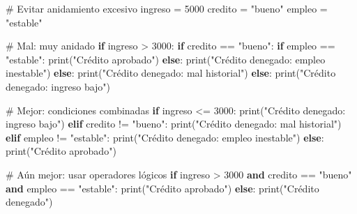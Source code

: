 \documentclass[
  doc,
  floatsintext,
  longtable,
  a4paper,
  nolmodern,
  notxfonts,
  notimes,
  12pt,
  colorlinks=true,linkcolor=blue,citecolor=blue,urlcolor=blue]{apa7}
\newenvironment{Shaded}{\begin{snugshade}}{\end{snugshade}}
\newcommand{\BuiltInTok}[1]{\textcolor[rgb]{0.00,0.23,0.31}{#1}}
\newcommand{\CommentTok}[1]{\textcolor[rgb]{0.37,0.37,0.37}{#1}}
\newcommand{\ControlFlowTok}[1]{\textcolor[rgb]{0.00,0.23,0.31}{\textbf{#1}}}
\newcommand{\DecValTok}[1]{\textcolor[rgb]{0.68,0.00,0.00}{#1}}
\newcommand{\KeywordTok}[1]{\textcolor[rgb]{0.00,0.23,0.31}{\textbf{#1}}}
\newcommand{\NormalTok}[1]{\textcolor[rgb]{0.00,0.23,0.31}{#1}}
\newcommand{\OperatorTok}[1]{\textcolor[rgb]{0.37,0.37,0.37}{#1}}
\newcommand{\StringTok}[1]{\textcolor[rgb]{0.13,0.47,0.30}{#1}}
\begin{document}
\begin{Shaded}
\begin{Highlighting}[]
\CommentTok{\# Evitar anidamiento excesivo}
\NormalTok{ingreso }\OperatorTok{=} \DecValTok{5000}
\NormalTok{credito }\OperatorTok{=} \StringTok{"bueno"}
\NormalTok{empleo }\OperatorTok{=} \StringTok{"estable"}

\CommentTok{\# Mal: muy anidado}
\ControlFlowTok{if}\NormalTok{ ingreso }\OperatorTok{\textgreater{}} \DecValTok{3000}\NormalTok{:}
    \ControlFlowTok{if}\NormalTok{ credito }\OperatorTok{==} \StringTok{"bueno"}\NormalTok{:}
        \ControlFlowTok{if}\NormalTok{ empleo }\OperatorTok{==} \StringTok{"estable"}\NormalTok{:}
            \BuiltInTok{print}\NormalTok{(}\StringTok{"Crédito aprobado"}\NormalTok{)}
        \ControlFlowTok{else}\NormalTok{:}
            \BuiltInTok{print}\NormalTok{(}\StringTok{"Crédito denegado: empleo inestable"}\NormalTok{)}
    \ControlFlowTok{else}\NormalTok{:}
        \BuiltInTok{print}\NormalTok{(}\StringTok{"Crédito denegado: mal historial"}\NormalTok{)}
\ControlFlowTok{else}\NormalTok{:}
    \BuiltInTok{print}\NormalTok{(}\StringTok{"Crédito denegado: ingreso bajo"}\NormalTok{)}

\CommentTok{\# Mejor: condiciones combinadas}
\ControlFlowTok{if}\NormalTok{ ingreso }\OperatorTok{\textless{}=} \DecValTok{3000}\NormalTok{:}
    \BuiltInTok{print}\NormalTok{(}\StringTok{"Crédito denegado: ingreso bajo"}\NormalTok{)}
\ControlFlowTok{elif}\NormalTok{ credito }\OperatorTok{!=} \StringTok{"bueno"}\NormalTok{:}
    \BuiltInTok{print}\NormalTok{(}\StringTok{"Crédito denegado: mal historial"}\NormalTok{)}
\ControlFlowTok{elif}\NormalTok{ empleo }\OperatorTok{!=} \StringTok{"estable"}\NormalTok{:}
    \BuiltInTok{print}\NormalTok{(}\StringTok{"Crédito denegado: empleo inestable"}\NormalTok{)}
\ControlFlowTok{else}\NormalTok{:}
    \BuiltInTok{print}\NormalTok{(}\StringTok{"Crédito aprobado"}\NormalTok{)}

\CommentTok{\# Aún mejor: usar operadores lógicos}
\ControlFlowTok{if}\NormalTok{ ingreso }\OperatorTok{\textgreater{}} \DecValTok{3000} \KeywordTok{and}\NormalTok{ credito }\OperatorTok{==} \StringTok{"bueno"} \KeywordTok{and}\NormalTok{ empleo }\OperatorTok{==} \StringTok{"estable"}\NormalTok{:}
    \BuiltInTok{print}\NormalTok{(}\StringTok{"Crédito aprobado"}\NormalTok{)}
\ControlFlowTok{else}\NormalTok{:}
    \BuiltInTok{print}\NormalTok{(}\StringTok{"Crédito denegado"}\NormalTok{)}
\end{Highlighting}
\end{Shaded}
\end{document}
